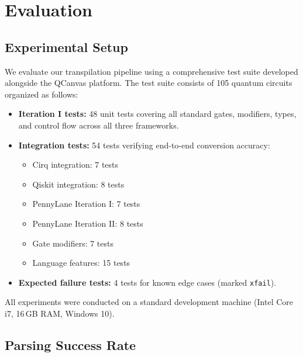 \documentclass[conference]{IEEEtran}
\begin{document}
\section{Evaluation}
\label{sec:evaluation}

\subsection{Experimental Setup}

We evaluate our transpilation pipeline using a comprehensive test suite developed alongside the QCanvas platform. The test suite consists of 105 quantum circuits organized as follows:

\begin{itemize}
    \item \textbf{Iteration I tests:} 48 unit tests covering all standard gates, modifiers, types, and control flow across all three frameworks.
    \item \textbf{Integration tests:} 54 tests verifying end-to-end conversion accuracy:
    \begin{itemize}
        \item Cirq integration: 7 tests
        \item Qiskit integration: 8 tests
        \item PennyLane Iteration I: 7 tests
        \item PennyLane Iteration II: 8 tests
        \item Gate modifiers: 7 tests
        \item Language features: 15 tests
    \end{itemize}
    \item \textbf{Expected failure tests:} 4 tests for known edge cases (marked \texttt{xfail}).
\end{itemize}

All experiments were conducted on a standard development machine (Intel Core i7, 16\,GB RAM, Windows 10).

\subsection{Parsing Success Rate}
\end{document}
